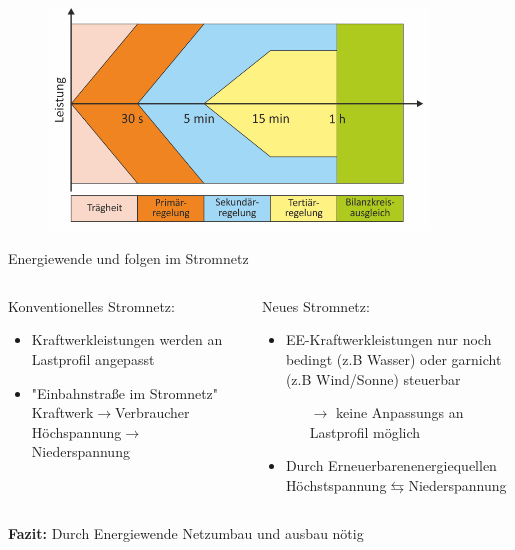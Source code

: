 \documentclass[aspectratio=1610, professionalfonts, 9pt]{beamer}
\begin{document}
{
\begin{frame}
  \begin{figure}
  \includegraphics[width=0.9\textwidth]{images/Regelleistung.png}
\end{figure}
\end{frame}
}

\begin{frame}{Energiewende und folgen im Stromnetz}
  \begin{columns}
  \begin{column}{0.5\textwidth}
Konventionelles Stromnetz:
\begin{itemize}
  \item Kraftwerkleistungen werden an Lastprofil angepasst
  \item "Einbahnstraße im Stromnetz" Kraftwerk$\rightarrow$Verbraucher
Höchspannung$\rightarrow$Niederspannung
\end{itemize}
  \end{column}
  \begin{column}{0.5\textwidth}
Neues Stromnetz:
\begin{itemize}
\item EE-Kraftwerkleistungen nur noch bedingt (z.B Wasser) oder garnicht (z.B Wind/Sonne) steuerbar
\begin{itemize}
  \item[$\rightarrow$] keine Anpassungs an Lastprofil möglich
\end{itemize}
\item Durch Erneuerbarenenergiequellen  Höchstspannung$\leftrightarrows$Niederspannung
\end{itemize}
\end{column}
\end{columns}
\textbf{\textcolor{tugreen}{Fazit:}} Durch Energiewende Netzumbau und ausbau nötig
\end{frame}
\end{document}
